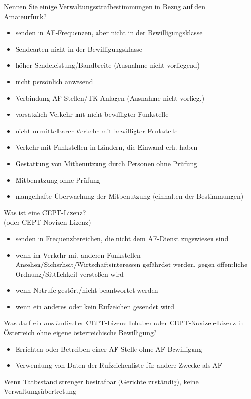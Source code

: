 \documentclass[avery5371,grid,frame,a4paper]{flashcards}
\newcommand{\card}[3]{
  \begin{flashcard}[{\chap} -- #1]{#2}#3\end{flashcard}
}
\begin{document}
\card{38}{Nennen Sie einige Verwaltungsstrafbestimmungen in Bezug auf den Amateurfunk?}{\footnotesize
\begin{minipage}{0.48\textwidth}
\begin{itemize}[leftmargin=10pt,itemsep=0pt]
  \item senden in AF-Frequenzen, aber nicht in der Bewilligungsklasse
  \item Sendearten nicht in der Bewilligungsklasse
  \item höher Sendeleistung/Bandbreite (Ausnahme nicht vorliegend)
  \item nicht persönlich anwesend
  \item Verbindung AF-Stellen/TK-Anlagen (Ausnahme nicht vorlieg.)
\end{itemize}
\end{minipage}
\begin{minipage}{0.5\textwidth}
\begin{itemize}[leftmargin=10pt,itemsep=0pt]
  \item vorsätzlich Verkehr mit nicht bewilligter Funkstelle
  \item nicht unmittelbarer Verkehr mit bewilligter Funkstelle
  \item Verkehr mit Funkstellen in Ländern, die Einwand erh. haben
  \item Gestattung von Mitbenutzung durch Personen ohne Prüfung
  \item Mitbenutzung ohne Prüfung
  \item mangelhafte Überwachung der Mitbenutzung (einhalten der Bestimmungen)
\end{itemize}
\end{minipage}
}

\card{39}{Was ist eine CEPT-Lizenz? \\ (oder CEPT-Novizen-Lizenz)}{\begin{itemize}\itemsep0pt \item senden in Frequenzbereichen, die nicht dem AF-Dienst zugewiesen sind \item wenn im Verkehr mit anderen Funkstellen Ansehen/Sicherheit/Wirtschaftsinteressen gefährdet werden, gegen öffentliche Ordnung/Sittlichkeit verstoßen wird \item wenn Notrufe gestört/nicht beantwortet werden \item wenn ein anderes oder kein Rufzeichen gesendet wird\end{itemize}}

\card{40}{Was darf ein ausländischer CEPT-Lizenz Inhaber oder CEPT-Novizen-Lizenz in Österreich ohne eigene österreichische Bewilligung?}{\begin{itemize}\itemsep1pt \item Errichten oder Betreiben einer AF-Stelle ohne AF-Bewilligung \item Verwendung von Daten der Rufzeichenliste für andere Zwecke als AF \end{itemize} Wenn Tatbestand strenger bestrafbar
(Gerichte zuständig), keine Verwaltungsübertretung.}
\end{document}
